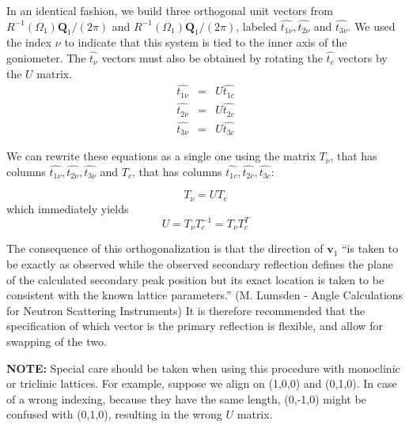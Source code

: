 \documentclass[prb]{revtex4}%
\begin{document}
In an identical fashion, we build three orthogonal unit vectors from $R^{-1}(\Omega_1)\textbf{Q}_1/(2\pi)$ and $R^{-1}(\Omega_1)\textbf{Q}_1/(2\pi)$, labeled $\widehat{t_{1\nu}}, \widehat{t_{2\nu}}$
and $\widehat{t_{3\nu}}$. We used the index $\nu$ to indicate that this system is tied to the inner axis
of the goniometer. The $\widehat{t_{\nu}}$ vectors must also be obtained by rotating the $\widehat{t_c}$ vectors
by the $U$ matrix.
\begin{eqnarray}
  \nonumber \widehat{t_{1\nu}}&=& U \widehat{t_{1c}} \\
  \widehat{t_{2\nu}}&=& U \widehat{t_{2c}} \\
  \nonumber \widehat{t_{3\nu}}&=& U \widehat{t_{3c}}
\end{eqnarray}

We can rewrite these equations as a single one using the matrix $T_{\nu}$, that has columns
$\widehat{t_{1\nu}},\widehat{t_{2\nu}}, \widehat{t_{3\nu}}$ and $T_c$, that has columns
$\widehat{t_{1c}},\widehat{t_{2c}}, \widehat{t_{3c}}$:

\begin{equation}
    T_{\nu}=U T_c
\end{equation}
which immediately yields
\begin{equation}
    U = T_{\nu}T_c^{-1} = T_{\nu}T_c^{T}
\end{equation}

The consequence of this orthogonalization is that the direction of $\textbf{v}_1$
``is taken to be exactly as observed while the observed secondary reflection defines the plane
of the calculated secondary peak position but its exact location is taken to be consistent with
the known lattice parameters.'' (M. Lumsden - Angle Calculations for Neutron Scattering Instruments)
It is therefore recommended that the specification of which vector is the primary reflection is flexible,
and allow for swapping of the two.

\textbf{NOTE:} Special care should be taken when using this procedure with monoclinic
or triclinic lattices. For example, suppose we align on (1,0,0) and (0,1,0). In case of a wrong indexing,
because they have the same length, (0,-1,0) might be confused with (0,1,0), resulting in the wrong $U$ matrix.
\end{document}

